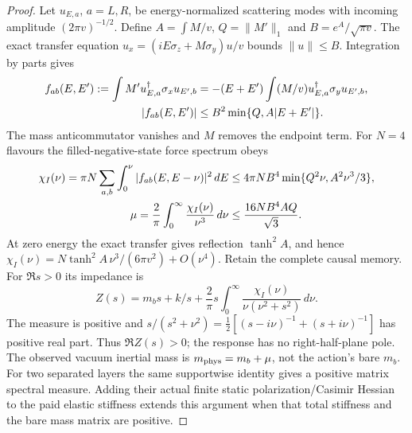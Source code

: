 \documentclass[12pt,a4paper]{article}
\begin{document}
\begin{proof}
Let $u_{E,a}$, $a=L,R$, be energy-normalized scattering modes with
incoming amplitude $(2\pi v)^{-1/2}$. Define
$A=\int M/v$, $Q=\|M'\|_1$ and $B=e^A/\sqrt{\pi v}$.
The exact transfer equation
$u_x=(iE\sigma_z+M\sigma_y)u/v$ bounds $\|u\|\le B$.
Integration by parts gives
\begin{align}
 f_{ab}(E,E'):=\int M'u_{E,a}^\dagger\sigma_xu_{E',b}
 &=-(E+E')\int(M/v)u_{E,a}^\dagger\sigma_yu_{E',b},\notag\\
 |f_{ab}(E,E')|&\le B^2\min\{Q,A|E+E'|\}.                \label{eq:Dirac-force-identity}
\end{align}
The mass anticommutator vanishes and $M$ removes the endpoint term.
For $N=4$ flavours the filled-negative-state force spectrum obeys
\begin{align}
 \chi_I(\nu)=\pi N\sum_{a,b}\int_0^\nu
                 |f_{ab}(E,E-\nu)|^2\,dE
 &\le4\pi NB^4\min\{Q^2\nu,A^2\nu^3/3\},\notag\\
 \mu=\frac2\pi\int_0^\infty\frac{\chi_I(\nu)}{\nu^3}\,d\nu
 &\le\frac{16NB^4AQ}{\sqrt3}.                             \label{eq:Dirac-vacuum-mass}
\end{align}
At zero energy the exact transfer gives reflection $\tanh^2A$,
and hence $\chi_I(\nu)=N\tanh^2A\,\nu^3/(6\pi v^2)+O(\nu^4)$.
Retain the complete causal memory. For $\Re s>0$ its impedance is
\begin{equation}
 Z(s)=m_bs+k/s+\frac2\pi s\int_0^\infty
              \frac{\chi_I(\nu)}{\nu(\nu^2+s^2)}\,d\nu.  \label{eq:Dirac-passive-impedance}
\end{equation}
The measure is positive and
$s/(s^2+\nu^2)=\tfrac12[(s-i\nu)^{-1}+(s+i\nu)^{-1}]$
has positive real part. Thus $\Re Z(s)>0$; the response has no
right-half-plane pole. The observed vacuum inertial mass is
$m_{\rm phys}=m_b+\mu$, not the action's bare $m_b$.
For two separated layers the same supportwise identity gives a
positive matrix spectral measure. Adding their actual finite static
polarization/Casimir Hessian to the paid elastic stiffness extends
this argument when that total stiffness and the bare mass matrix are
positive.


\end{proof}
\end{document}
